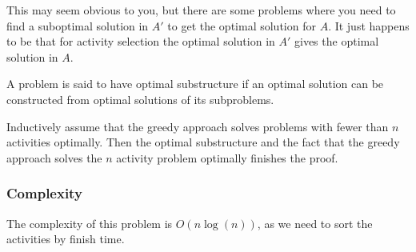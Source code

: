 \begin{remark}
    This may seem obvious to you, but there are some problems where
    you need to find a suboptimal solution in $A'$ to get the optimal
    solution for $A$. It just happens to be that for activity
    selection the optimal solution in $A'$ gives the optimal solution
    in $A$.
\end{remark}

\begin{definition}
    A problem is said to have optimal substructure if an optimal
    solution can be constructed from optimal solutions of its subproblems.
\end{definition}

Inductively assume that the greedy approach solves problems with
fewer than $n$ activities optimally. Then the optimal substructure and
the fact that the greedy approach solves the $n$ activity problem
optimally finishes the proof.

\subsubsection{Complexity}

The complexity of this problem is $O(n\log(n))$, as we need to sort
the activities by finish time.











